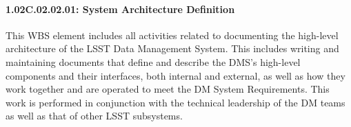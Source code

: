 \paragraph*{1.02C.02.02.01: System Architecture Definition}

This WBS element includes all activities related to documenting the high-level
architecture of the LSST Data Management System.  This includes writing and
maintaining documents that define and describe the DMS's high-level components
and their interfaces, both internal and external, as well as how they work
together and are operated to meet the DM System Requirements.  This work is
performed in conjunction with the technical leadership of the DM teams as well
as that of other LSST subsystems.
